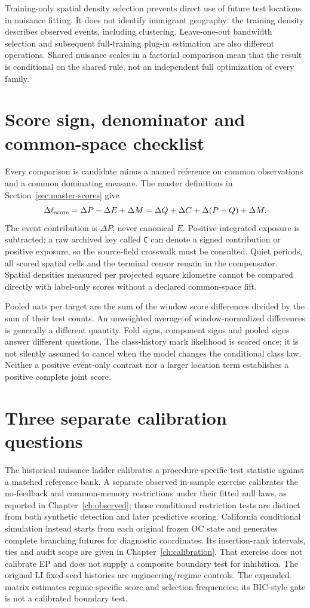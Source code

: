 Training-only spatial density selection prevents direct use of future test locations in nuisance fitting. It does not identify immigrant geography: the training density describes observed events, including clustering. Leave-one-out bandwidth selection and subsequent full-training plug-in estimation are also different operations. Shared nuisance scales in a factorial comparison mean that the result is conditional on the shared rule, not an independent full optimization of every family.

\section{Score sign, denominator and common-space checklist}\label{sec:score-audit}

Every comparison is candidate minus a named reference on common observations and a common dominating measure. The master definitions in Section~\ref{sec:master-scores} give
\[
 \Delta\ell_{\rm score}=\Delta P-\Delta E+\Delta M
 =\Delta Q+\Delta C+\Delta(P-Q)+\Delta M.
\]
The event contribution is $\Delta P$, never canonical $E$. Positive integrated exposure is subtracted; a raw archived key called \texttt{C} can denote a signed contribution or positive exposure, so the source-field crosswalk must be consulted. Quiet periods, all scored spatial cells and the terminal censor remain in the compensator. Spatial densities measured per projected square kilometre cannot be compared directly with label-only scores without a declared common-space lift.

Pooled nats per target are the sum of the window score differences divided by the sum of their test counts. An unweighted average of window-normalized differences is generally a different quantity. Fold signs, component signs and pooled signs answer different questions. The class-history mark likelihood is scored once; it is not silently assumed to cancel when the model changes the conditional class law. Neither a positive event-only contrast nor a larger location term establishes a positive complete joint score.

\section{Three separate calibration questions}

The historical nuisance ladder calibrates a procedure-specific test statistic against a matched reference bank. A separate observed in-sample exercise calibrates the no-feedback and common-memory restrictions under their fitted null laws, as reported in Chapter~\ref{ch:observed}; those conditional restriction tests are distinct from both synthetic detection and later predictive scoring. California conditional simulation instead starts from each original frozen OC state and generates complete branching futures for diagnostic coordinates. Its insertion-rank intervals, ties and audit scope are given in Chapter~\ref{ch:calibration}. That exercise does not calibrate EP and does not supply a composite boundary test for inhibition. The original LI fixed-seed histories are engineering/regime controls. The expanded matrix estimates regime-specific score and selection frequencies; its BIC-style gate is not a calibrated boundary test.

